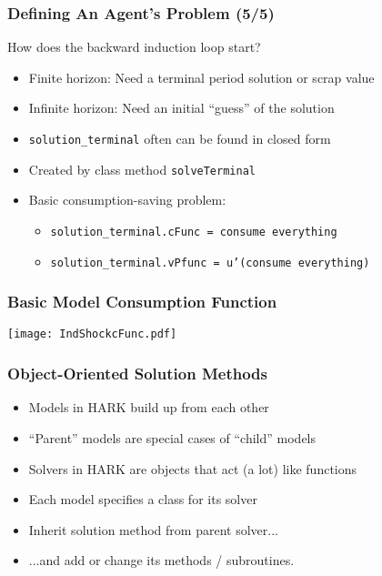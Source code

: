 \documentclass[11ptt]{beamer}
\newcommand{\bi}{\begin{itemize}}
\newcommand{\ei}{\end{itemize}}
\begin{document}
\begin{frame}
\frametitle{Defining An Agent's Problem (5/5)}

How does the backward induction loop start?
\bi
\item <1->Finite horizon: Need a terminal period solution or scrap value

\item <1->Infinite horizon: Need an initial ``guess'' of the solution

\item <2->\texttt{solution\_terminal} often can be found in closed form

\item <2->Created by class method \texttt{solveTerminal}

\item <3->Basic consumption-saving problem:
\bi
\item \texttt{solution\_terminal.cFunc = consume everything}

\item \texttt{solution\_terminal.vPfunc = u'(consume everything)}
\ei
\ei
\end{frame}


\begin{frame}
\frametitle{Basic Model Consumption Function}
\begin{center}
\texttt{[image: IndShockcFunc.pdf]}
\end{center}
\end{frame}


\begin{frame}
\frametitle{Object-Oriented Solution Methods}
\begin{itemize}
\item <1->Models in HARK build up from each other

\item <1->``Parent'' models are special cases of ``child'' models

\item <2->Solvers in HARK are objects that act (a lot) like functions

\item <2->Each model specifies a class for its solver

\item <2->Inherit solution method from parent solver...

\item <2->...and add or change its methods / subroutines.
\end{itemize}
\end{frame}
\end{document}
